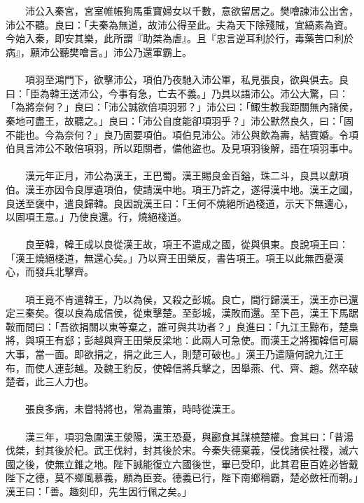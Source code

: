 \\\\
　　沛公入秦宮，宮室帷帳狗馬重寶婦女以千數，意欲留居之。樊噲諫沛公出舍，沛公不聽。良曰：「夫秦為無道，故沛公得至此。夫為天下除殘賊，宜縞素為資。今始入秦，即安其樂，此所謂『助桀為虐』。且『忠言逆耳利於行，毒藥苦口利於病』，願沛公聽樊噲言。」沛公乃還軍霸上。
\\\\
　　項羽至鴻門下，欲擊沛公，項伯乃夜馳入沛公軍，私見張良，欲與俱去。良曰：「臣為韓王送沛公，今事有急，亡去不義。」乃具以語沛公。沛公大驚，曰：「為將奈何？」良曰：「沛公誠欲倍項羽邪？」沛公曰：「鯫生教我距關無內諸侯，秦地可盡王，故聽之。」良曰：「沛公自度能卻項羽乎？」沛公默然良久，曰：「固不能也。今為奈何？」良乃固要項伯。項伯見沛公。沛公與飲為壽，結賓婚。令項伯具言沛公不敢倍項羽，所以距關者，備他盜也。及見項羽後解，語在項羽事中。
\\\\
　　漢元年正月，沛公為漢王，王巴蜀。漢王賜良金百鎰，珠二斗，良具以獻項伯。漢王亦因令良厚遺項伯，使請漢中地。項王乃許之，遂得漢中地。漢王之國，良送至襃中，遣良歸韓。良因說漢王曰：「王何不燒絕所過棧道，示天下無還心，以固項王意。」乃使良還。行，燒絕棧道。
\\\\
　　良至韓，韓王成以良從漢王故，項王不遣成之國，從與俱東。良說項王曰：「漢王燒絕棧道，無還心矣。」乃以齊王田榮反，書告項王。項王以此無西憂漢心，而發兵北擊齊。
\\\\
　　項王竟不肯遣韓王，乃以為侯，又殺之彭城。良亡，間行歸漢王，漢王亦已還定三秦矣。復以良為成信侯，從東擊楚。至彭城，漢敗而還。至下邑，漢王下馬踞鞍而問曰：「吾欲捐關以東等棄之，誰可與共功者？」良進曰：「九江王黥布，楚梟將，與項王有郄；彭越與齊王田榮反梁地：此兩人可急使。而漢王之將獨韓信可屬大事，當一面。即欲捐之，捐之此三人，則楚可破也。」漢王乃遣隨何說九江王布，而使人連彭越。及魏王豹反，使韓信將兵擊之，因舉燕、代、齊、趙。然卒破楚者，此三人力也。
\\\\
　　張良多病，未嘗特將也，常為畫策，時時從漢王。
\\\\
　　漢三年，項羽急圍漢王滎陽，漢王恐憂，與酈食其謀橈楚權。食其曰：「昔湯伐桀，封其後於杞。武王伐紂，封其後於宋。今秦失德棄義，侵伐諸侯社稷，滅六國之後，使無立錐之地。陛下誠能復立六國後世，畢已受印，此其君臣百姓必皆戴陛下之德，莫不鄉風慕義，願為臣妾。德義已行，陛下南鄉稱霸，楚必斂衽而朝。」漢王曰：「善。趣刻印，先生因行佩之矣。」
\\\\
